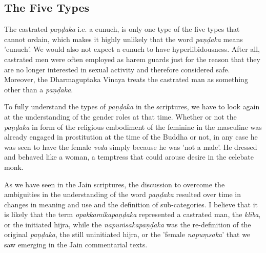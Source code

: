\subsection{The Five Types}
The castrated {\em paṇḍaka} i.e. a eunuch, is only one type of the five types that cannot ordain, which makes it highly unlikely that the word {\em paṇḍaka} means 'eunuch'. We would also not expect a eunuch to have hyperlibidousness. After all, castrated men were often employed as harem guards just for the reason that they are no longer interested in sexual activity and therefore considered safe. Moreover, the Dharmaguptaka Vinaya treats the castrated man as something other than a {\em paṇḍaka}.

To fully understand the types of {\em paṇḍaka} in the scriptures, we have to look again at the understanding of the gender roles at that time. Whether or not the {\em paṇḍaka} in form of the religious embodiment of the feminine in the masculine was already engaged in prostitution at the time of the Buddha or not, in any case he was seen to have the female {\em veda} simply because he was 'not a male'. He dressed and behaved like a woman, a temptress that could arouse desire in the celebate monk. 

As we have seen in the Jain scriptures, the discussion to overcome the ambiguities in the understanding of the word {\em paṇḍaka} resulted over time in changes in meaning and use and the definition of sub-categories. I believe that it is likely that the term {\em opakkamikapaṇḍaka} represented a castrated man, the {\em klība}, or the initiated hijra, while the {\em napuṁsakapaṇḍaka} was the re-definition of the original {\em paṇḍaka}, the still uninitiated hijra, or the 'female {\em napuṃsaka}' that we saw emerging in the Jain commentarial texts.

